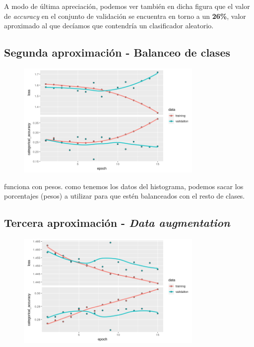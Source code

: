 \documentclass[]{article}
\begin{document}
		A modo de última apreciación, podemos ver también en dicha figura que el valor de \textit{accuracy} en el conjunto de validación se encuentra en torno a un \textbf{26\%}, valor aproximado al que decíamos que contendría un clasificador aleatorio.
		
	\subsection{Segunda aproximación - Balanceo de clases}
	
		\begin{figure}[h]
			\centering
			\includegraphics[width=0.8\textwidth]{./img/model2}
			\caption{}
			\label{}
		\end{figure}
	
	funciona con pesos. como tenemos los datos del histograma, podemos sacar los porcentajes (pesos) a utilizar para que estén balanceados con el resto de clases.
	
	\subsection{Tercera aproximación - \textit{Data augmentation}}
	
		\begin{figure}[h]
			\centering
			\includegraphics[width=0.8\textwidth]{./img/model3}
			\caption{}
			\label{}
		\end{figure}
	
\end{document}
